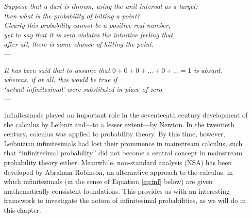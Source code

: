 \newcommand{\parthead}[2]{%
\bigskip

\begin{center}
  \spacedallcaps{Part #1}\\\vspace{.3em}
  \spacedallcaps{#2}
\end{center}

\medskip
}

\begin{flushright}
    {\footnotesize \textit{Suppose that a dart is thrown, using the unit interval as a target;\\
    then what is the probability of hitting a point?\\
    Clearly this probability cannot be a positive real number,\\
    yet to say that it is zero violates the intuitive feeling that,\\
    after all, there is some chance of hitting the point.}\\
    ---\citet[p.~171]{BernsteinWattenberg:1969}}
\end{flushright}

\begin{flushright}
    {\footnotesize \textit{It has been said that to assume that $0+0+0+ ... +0+ ... =1$ is absurd,\\
    whereas, if at all, this would be true if\\
    `actual infinitesimal' were substituted in place of zero.}\\
    ---\citet[p.~347]{deFinetti:1974}}\label{quote:dF}
\end{flushright}



\noindent Infinitesimals played an important role in the seventeenth century development of the calculus by Leibniz and---to a lesser extent---by Newton. In the twentieth century, calculus was applied to probability theory. By this time, however, Leibnizian infinitesimals had lost their prominence in mainstream calculus, such that ``infinitesimal probability'' did not become a central concept in mainstream probability theory either. Meanwhile, non-standard analysis (NSA) has been developed by Abraham Robinson, an alternative approach to the calculus, in which infinitesimals (in the sense of Equation \ref{eq:inf} below) are given mathematically consistent foundations. This provides us with an interesting framework to investigate the notion of infinitesimal probabilities, as we will do in this chapter.

